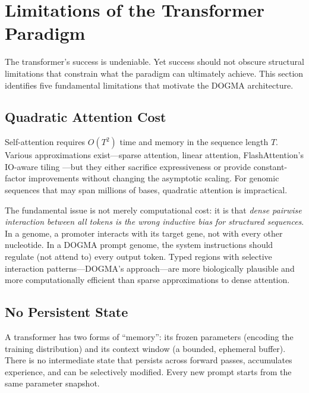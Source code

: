 \section{Limitations of the Transformer Paradigm}
\label{sec:transformer-limitations}

The transformer's success is undeniable. Yet success should not obscure structural limitations that constrain what the paradigm can ultimately achieve. This section identifies five fundamental limitations that motivate the DOGMA architecture.

\subsection{Quadratic Attention Cost}

Self-attention requires $O(T^2)$ time and memory in the sequence length $T$. Various approximations exist---sparse attention, linear attention, FlashAttention's IO-aware tiling \citep{dao2022}---but they either sacrifice expressiveness or provide constant-factor improvements without changing the asymptotic scaling. For genomic sequences that may span millions of bases, quadratic attention is impractical.

\begin{keyinsight}
The fundamental issue is not merely computational cost: it is that \emph{dense pairwise interaction between all tokens is the wrong inductive bias for structured sequences}. In a genome, a promoter interacts with its target gene, not with every other nucleotide. In a DOGMA prompt genome, the system instructions should regulate (not attend to) every output token. Typed regions with selective interaction patterns---DOGMA's approach---are more biologically plausible and more computationally efficient than sparse approximations to dense attention.
\end{keyinsight}

\subsection{No Persistent State}

A transformer has two forms of ``memory'': its frozen parameters (encoding the training distribution) and its context window (a bounded, ephemeral buffer). There is no intermediate state that persists across forward passes, accumulates experience, and can be selectively modified. Every new prompt starts from the same parameter snapshot.

